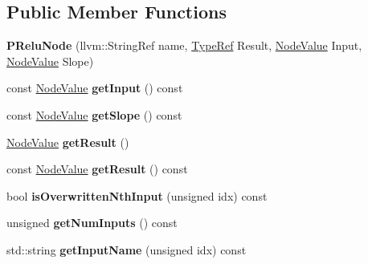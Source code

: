 \subsection*{Public Member Functions}
\begin{DoxyCompactItemize}
\item 
\mbox{\label{classglow_1_1_p_relu_node_a3945ac387af917885d339f9fb7afc89f}} 
{\bfseries P\+Relu\+Node} (llvm\+::\+String\+Ref name, \hyperlink{structglow_1_1_type}{Type\+Ref} Result, \hyperlink{structglow_1_1_node_value}{Node\+Value} Input, \hyperlink{structglow_1_1_node_value}{Node\+Value} Slope)
\item 
\mbox{\label{classglow_1_1_p_relu_node_ac8f7aa9e23ce793e4b2b5aa9b347d4a2}} 
const \hyperlink{structglow_1_1_node_value}{Node\+Value} {\bfseries get\+Input} () const
\item 
\mbox{\label{classglow_1_1_p_relu_node_a76ef022df76ae14585331885311fe956}} 
const \hyperlink{structglow_1_1_node_value}{Node\+Value} {\bfseries get\+Slope} () const
\item 
\mbox{\label{classglow_1_1_p_relu_node_a4e05dbabd2be70cf370b9644e3063961}} 
\hyperlink{structglow_1_1_node_value}{Node\+Value} {\bfseries get\+Result} ()
\item 
\mbox{\label{classglow_1_1_p_relu_node_abcaaca52a804455390d32a60d54a82ae}} 
const \hyperlink{structglow_1_1_node_value}{Node\+Value} {\bfseries get\+Result} () const
\item 
\mbox{\label{classglow_1_1_p_relu_node_ab310296827d22d2237596c32f745b13c}} 
bool {\bfseries is\+Overwritten\+Nth\+Input} (unsigned idx) const
\item 
\mbox{\label{classglow_1_1_p_relu_node_a2a37fb41e36dfc5fc2cf0a5c534cb3f8}} 
unsigned {\bfseries get\+Num\+Inputs} () const
\item 
\mbox{\label{classglow_1_1_p_relu_node_a1650bfa98482231af1db33d83c7a7465}} 
std\+::string {\bfseries get\+Input\+Name} (unsigned idx) const
\item 

\end{DoxyCompactItemize}
